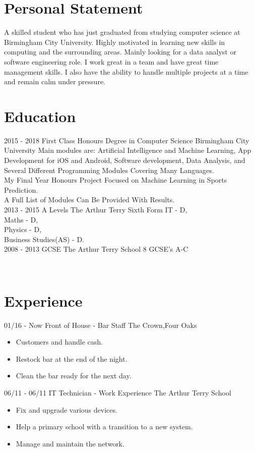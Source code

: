 \documentclass[]{friggeri-cv}
\begin{document}
\section{Personal Statement}
A skilled student who has just graduated from studying computer science at Birmingham City
University. Highly motivated in learning new skills in computing and the surrounding areas. Mainly
looking for a data analyst or software engineering role. I work great in a team and have great time
management skills. I also have the ability to handle multiple projects at a time and remain calm under pressure.
\section{Education}
\begin{entrylist}
  \entry
    {2015 - 2018}
    {First Class Honours Degree in Computer Science}
    {Birmingham City University}
    {Main modules are: Artificial Intelligence and Machine Learning, App Development for iOS and Android, Software development, Data Analysis, and Several Different Programming Modules Covering Many Languages.\\ My Final Year Honours Project Focused on Machine Learning in Sports Prediction. \\ A Full List of Modules Can Be Provided With Results.\\}
  \entry
    {2013 - 2015}
    {A Levels}
    {The Arthur Terry Sixth Form}
    {IT - D,\\ Maths - D,\\ Physics - D,\\ Business Studies(AS) - D.\\}
  \entry
    {2008 - 2013}
    {GCSE}
    {The Arthur Terry School}
    {8 GCSE's A-C}
\end{entrylist}
\\
\section{Experience}
\begin{entrylist}
  \entry
    {01/16 - Now}
    {Front of House - Bar Staff}
    {The Crown,Four Oaks}
    {\begin{itemize}
    	\item Customers and handle cash.
    	\item Restock bar at the end of the night.
    	\item  Clean the bar ready for the next day.
    \end{itemize}}
  \entry
    {06/11 - 06/11}
    {IT Technician - Work Experience }
    {The Arthur Terry School}
    {\begin{itemize}
    	\item Fix and upgrade various devices.
    	\item Help a primary school with a transition to a new system.
    	\item Manage and maintain the network.
    \end{itemize}}
\end{entrylist}
\newpage
\end{document}
